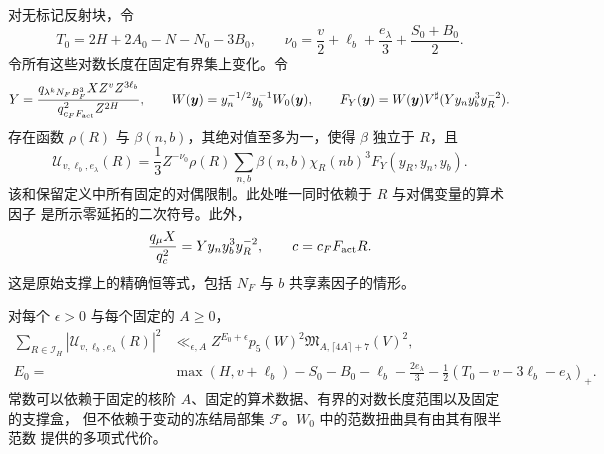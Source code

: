 \begin{lemma}[无标记反射块]
\label{lem:unmarked-reflected-block}
对无标记反射块，令
\[
 T_0=2H+2A_0-N-N_0-3B_0,\qquad
 \nu_0=\frac v2+\ell_b+\frac{e_\lambda}{3}+\frac{S_0+B_0}{2}.
\]
令所有这些对数长度在固定有界集上变化。令
\[
 Y=\frac{q_{\lambda^kN_FB_F^3}X Z^vZ^{3\ell_b}}
          {q_{c_FF_{\rm act}}^2Z^{2H}},\qquad
 W(\boldsymbol y)=y_n^{-1/2}y_b^{-1}W_0(\boldsymbol y),\qquad
 F_Y(\boldsymbol y)=W(\boldsymbol y)V^\sharp(Yy_ny_b^3y_R^{-2}).
\]
存在函数 $\rho(R)$ 与 $\beta(n,b)$，其绝对值至多为一，使得 $\beta$ 独立于 $R$，且
\begin{equation}\label{eq:unmarked-structural-block}
 \mathcal U_{v,\ell_b,e_\lambda}(R)
 =\frac13 Z^{-\nu_0}\rho(R)
       \sum_{n,b}\beta(n,b)\chi_R(nb)^3F_Y(y_R,y_n,y_b).
\end{equation}
该和保留定义中所有固定的对偶限制。此处唯一同时依赖于 $R$ 与对偶变量的算术因子
是所示零延拓的二次符号。此外，
\begin{equation}\label{eq:unmarked-actual-annuli}
 \frac{q_\mu X}{q_c^2}=Yy_ny_b^3y_R^{-2},\qquad
 c=c_FF_{\rm act}R.
\end{equation}
这是原始支撑上的精确恒等式，包括 $N_F$ 与 $b$ 共享素因子的情形。

对每个 $\epsilon>0$ 与每个固定的 $A\ge0$，
\begin{equation}\label{eq:unmarked-reflected-energy}
 \begin{split}
 \sum_{R\in\mathcal I_H}|\mathcal U_{v,\ell_b,e_\lambda}(R)|^2
 &\ll_{\epsilon,A} Z^{E_0+\epsilon}p_5(W)^2
       \mathfrak M_{A,\lceil4A\rceil+7}(V)^2,\\
 E_0={}&\max(H,v+\ell_b)-S_0-B_0-\ell_b-\frac{2e_\lambda}{3}
       -\frac12(T_0-v-3\ell_b-e_\lambda)_+.
 \end{split}
\end{equation}
常数可以依赖于固定的核阶 $A$、固定的算术数据、有界的对数长度范围以及固定的支撑盒，
但不依赖于变动的冻结局部集 $\mathcal F$。$W_0$ 中的范数扭曲具有由其有限半范数
提供的多项式代价。
\end{lemma}

